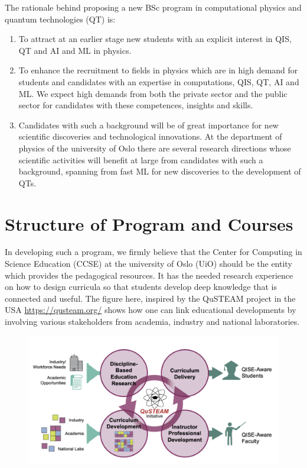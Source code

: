 \documentclass[aps,rmp,preprint,amsmath,amssymb,graphicx,longbibliography]{revtex4-1}
\begin{document}
The rationale behind proposing a new BSc program in computational physics and quantum technologies (QT) is:
\begin{enumerate}
    \item To attract at an earlier stage new students with an explicit interest in QIS, QT and AI and ML in physics. 
    \item To enhance the recruitment to fields in physics which are in high demand for students and candidates with an expertise in computations, QIS, QT, AI and ML. We expect high demands from both the private sector and the public sector for candidates with these competences, insights and skills.
    \item Candidates with such a background will be of great importance for new scientific discoveries and technological innovations. At the department of physics of the university of Oslo there are several research directions whose scientific activities will benefit at large from candidates with such a background, spanning from fast ML for new discoveries to the development of QTs.   
\end{enumerate}


\section{Structure of Program and Courses}

In developing such a program, we firmly believe that 
the Center for Computing in Science Education (CCSE) at the university of Oslo (UiO) should be the entity which provides the pedagogical resources. It has the needed research experience
on how to design curricula so that students develop deep knowledge that is connected and useful.
The figure here, inspired by the QuSTEAM project in the USA \url{https://qusteam.org/}
shows how one can link educational developments by involving various stakeholders from academia, industry and national laboratories. 
\begin{figure}[!htb]
\includegraphics[width=1.0\linewidth]{qusteam.png}
\end{figure}
\end{document}
